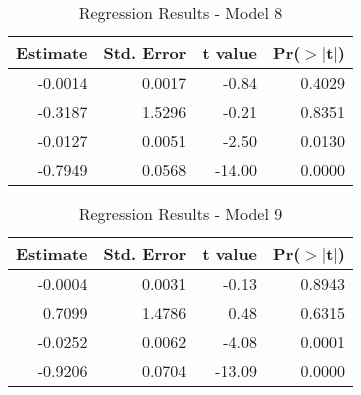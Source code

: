 \begin{table}[ht]
\centering
\begin{tabular}{rrrr}
  \hline
Estimate & Std. Error & t value & Pr($>$$|$t$|$) \\ 
  \hline
-0.0014 & 0.0017 & -0.84 & 0.4029 \\ 
  -0.3187 & 1.5296 & -0.21 & 0.8351 \\ 
  -0.0127 & 0.0051 & -2.50 & 0.0130 \\ 
  -0.7949 & 0.0568 & -14.00 & 0.0000 \\ 
   \hline
\end{tabular}
\caption{Regression Results - Model 8} 
\end{table}
\begin{table}[ht]
\centering
\begin{tabular}{rrrr}
  \hline
Estimate & Std. Error & t value & Pr($>$$|$t$|$) \\ 
  \hline
-0.0004 & 0.0031 & -0.13 & 0.8943 \\ 
  0.7099 & 1.4786 & 0.48 & 0.6315 \\ 
  -0.0252 & 0.0062 & -4.08 & 0.0001 \\ 
  -0.9206 & 0.0704 & -13.09 & 0.0000 \\ 
   \hline
\end{tabular}
\caption{Regression Results - Model 9} 
\end{table}

